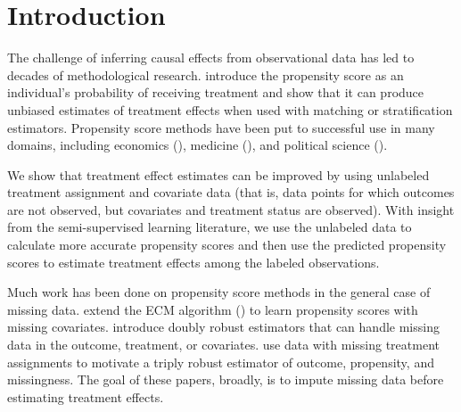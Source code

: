 \documentclass[aos]{imsart}
\begin{document}
\section{Introduction}
The challenge of inferring causal effects from observational data has led to decades of methodological research.
\cite{rosenbaum1983central} introduce the propensity score as an individual's probability of receiving treatment and show that 
it can produce unbiased estimates of treatment effects when used with matching or stratification estimators.
Propensity score methods have been put to successful use in many domains, including economics (\cite{heckman1997matching}), 
medicine (\cite{luo2010applying}), and political science (\cite{fong2018covariate}).

We show that treatment effect estimates can be improved by using unlabeled treatment assignment 
and covariate data (that is, data points for which outcomes are not observed, but covariates and treatment status are observed). 
With insight from the semi-supervised learning literature, we use the unlabeled data to calculate more accurate propensity 
scores and then use the predicted propensity scores to estimate treatment effects among the labeled observations.

Much work has been done on propensity score methods in the general case of missing data. 
\cite{d2000estimating} extend the ECM algorithm (\cite{meng1993maximum}) to learn propensity scores with missing covariates. 
\cite{williamson2012doubly} introduce doubly robust estimators that can handle missing data in the outcome, treatment, or covariates.
\cite{zhang2016causal} use data with missing treatment assignments to motivate a triply robust estimator of outcome, propensity, and missingness.
The goal of these papers, broadly, is to impute missing data before estimating treatment effects. 
\end{document}

